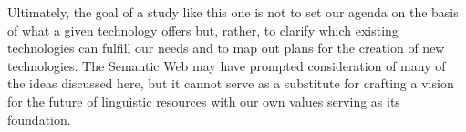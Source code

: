 Ultimately, the goal of a study like this one is not to set our agenda on the
basis of what a given technology offers but, rather, to clarify which existing
technologies can fulfill our needs and to map out plans for the creation of new
technologies. The Semantic Web may have prompted consideration of many of the
ideas discussed here, but it cannot serve as a substitute for crafting a vision
for the future of linguistic resources with our own values serving as its
foundation.



% 
% 
